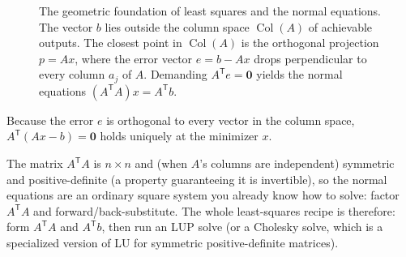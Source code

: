 \begin{figure}[htbp]
\caption{The geometric foundation of least squares and the normal equations. The vector $b$ lies outside the column space $\operatorname{Col}(A)$ of achievable outputs. The closest point in $\operatorname{Col}(A)$ is the orthogonal projection $p = Ax$, where the error vector $e = b - Ax$ drops perpendicular to every column $a_j$ of $A$. Demanding $A^{\mathsf T}e = \mathbf{0}$ yields the normal equations $(A^{\mathsf T}A)x = A^{\mathsf T}b$.}
\label{ch27:fig-least-squares-projection}
\end{figure}

Because the error $e$ is orthogonal to every vector in the column space, $A^{\mathsf T}(Ax - b) = \mathbf{0}$ holds uniquely at the minimizer $x$.

The matrix $A^{\mathsf T}A$ is $n\times n$ and (when $A$'s columns are independent)
symmetric and positive-definite (a property guaranteeing it is invertible), so the normal equations are an ordinary square system
you already know how to solve: factor $A^{\mathsf T}A$ and forward/back-substitute.
The whole least-squares recipe is therefore: form $A^{\mathsf T}A$ and
$A^{\mathsf T}b$, then run an LUP solve (or a Cholesky solve, which is a specialized version of LU for symmetric positive-definite matrices).


